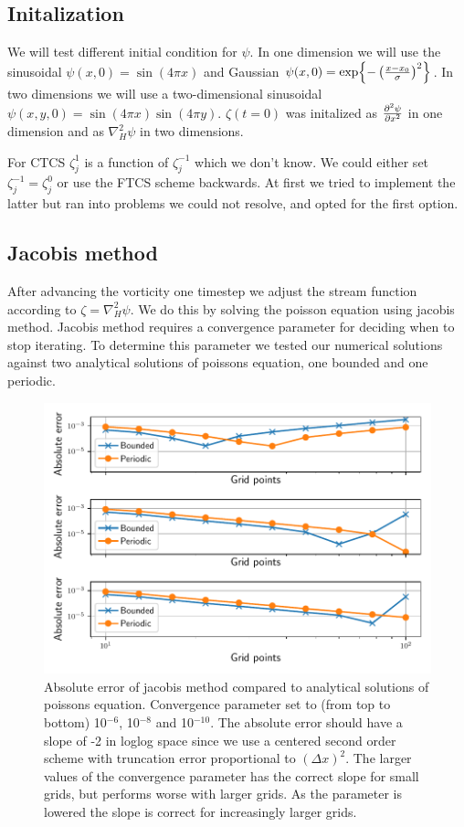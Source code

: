 \subsection{Initalization}

We will test different initial condition for $\psi$. In one dimension we will
use the sinusoidal $\psi(x, 0) = \sin{(4 \pi x)}$ and Gaussian $\psi(x, 0) =
\exp{-\left(\frac{x - x_0}{\sigma}\right)^2}$.
In two dimensions we will use a two-dimensional sinusoidal $\psi(x,y,0) =
\sin{(4 \pi x)} \sin{(4 \pi y)}$. $ \zeta(t=0) $ was initalized as $
\pdv[2]{\psi}{x} $ in one dimension and as $\nabla_H^2 \psi$ in two dimensions.

For CTCS $\zeta_{j}^{1}$ is a function of $\zeta_{j}^{-1}$ which we don't know.
We could either set $\zeta_{j}^{-1} = \zeta_{j}^{0}$ or use the FTCS scheme
backwards. At first we tried to implement the latter but ran into problems we
could not resolve, and opted for the first option.

\subsection{Jacobis method}

After advancing the vorticity one timestep we adjust the stream function
according to $\zeta = \nabla_H^2 \psi$.  We do this by solving the poisson
equation using
jacobis method. Jacobis method requires a convergence parameter for deciding
when to stop iterating. To determine this parameter we tested our
numerical solutions  against two analytical solutions
of poissons equation, one bounded and one periodic.

\begin{figure}[h]
  \centering
  \includegraphics[width=\textwidth]{../figures/error_jacobi.pdf}
  \caption{Absolute error of jacobis method
  compared to analytical solutions of poissons equation. Convergence parameter set to (from top to bottom) 10$^{-6}$, 10$^{-8}$ and 10$^{-10}$.
  The absolute error should have a slope of -2 in loglog space since we use
  a centered second order scheme with truncation error proportional to $(\Delta x)^2$.
  The larger values of the convergence parameter has the correct slope for small
  grids, but performs worse with larger grids. As the parameter is lowered the
  slope is correct for increasingly larger grids.}
  \label{fig:error_jacobi}
\end{figure}

